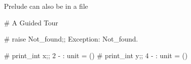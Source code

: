Prelude can also be in a file

# A Guided Tour

\begin{ocaml}
# raise Not_found;;
Exception: Not_found.
\end{ocaml}

\begin{ocaml}
# print_int x;;
2
- : unit = ()
# print_int y;;
4
- : unit = ()
\end{ocaml}
